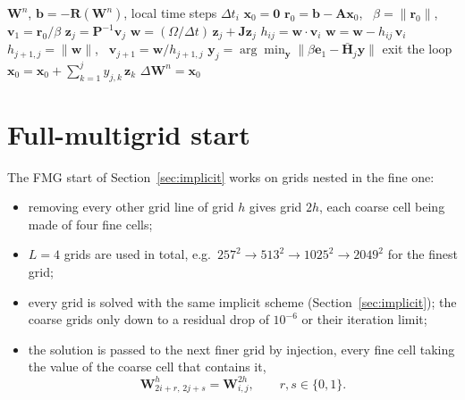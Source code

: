 \documentclass[12pt,a4paper]{article}
\begin{document}
\begin{algorithm}[H]
  \caption{Right-preconditioned restarted GMRES$(m)$ for one implicit step}
  \label{alg:gmres}
  \begin{algorithmic}[1]
    \REQUIRE $\mathbf{W}^n$, $\mathbf{b}=-\mathbf{R}(\mathbf{W}^n)$, local time steps $\Delta t_i$
    \STATE $\mathbf{x}_0=\mathbf{0}$ 
    \REPEAT
      \STATE $\mathbf{r}_0=\mathbf{b}-\mathbf{A}\mathbf{x}_0$, \ $\beta=\|\mathbf{r}_0\|$, \ $\mathbf{v}_1=\mathbf{r}_0/\beta$ 
        \STATE $\mathbf{z}_j=\mathbf{P}^{-1}\mathbf{v}_j$ 
        \STATE $\mathbf{w}=(\Omega/\Delta t)\,\mathbf{z}_j+\mathbf{J}\mathbf{z}_j$ 
          \STATE $h_{ij}=\mathbf{w}\cdot\mathbf{v}_i$ 
          \STATE $\mathbf{w}=\mathbf{w}-h_{ij}\,\mathbf{v}_i$ 
        \ENDFOR
        \STATE $h_{j+1,j}=\|\mathbf{w}\|$, \ $\mathbf{v}_{j+1}=\mathbf{w}/h_{j+1,j}$ 
        \STATE $\mathbf{y}_j=\arg\min_{\mathbf{y}}\|\beta\mathbf{e}_1-\bar{\mathbf{H}}_j\mathbf{y}\|$ 
          \STATE exit the loop 
        \ENDIF
      \ENDFOR
      \STATE $\mathbf{x}_0=\mathbf{x}_0+\sum_{k=1}^{j}y_{j,k}\,\mathbf{z}_k$ 
     
    \ENSURE $\Delta\mathbf{W}^n=\mathbf{x}_0$
  \end{algorithmic}
\end{algorithm}

\clearpage
\section{Full-multigrid start}\label{app:fmg}

The FMG start of Section~\ref{sec:implicit} works on grids nested in the fine one:
\begin{itemize}
  \item removing every other grid line of grid $h$ gives grid $2h$, each coarse cell being made
  of four fine cells;
  \item $L=4$ grids are used in total, e.g.\ $257^2\to513^2\to1025^2\to2049^2$ for the finest grid;
  \item every grid is solved with the same implicit scheme (Section~\ref{sec:implicit}); the coarse
  grids only down to a residual drop of $10^{-6}$ or their iteration limit;
  \item the solution is passed to the next finer grid by injection, every fine cell taking the
  value of the coarse cell that contains it,
  \begin{equation}
    \mathbf{W}^{h}_{2i+r,\,2j+s}=\mathbf{W}^{2h}_{i,j},\qquad r,s\in\{0,1\}.
    \label{eq:inject}
  \end{equation}
\end{itemize}
\end{document}
